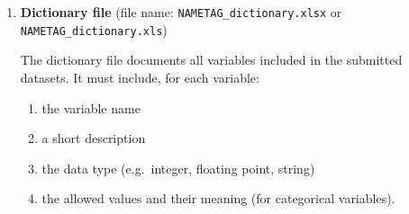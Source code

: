 \documentclass[11pt,a4paper]{article}
\begin{document}
\begin{enumerate}
\begin{table}[H]
\begin{tabularx}{\textwidth}{>{\raggedright\arraybackslash}p{2.5cm} >{\raggedright\arraybackslash}p{1.8cm} >{\raggedright\arraybackslash}p{2.3cm} X}
    \bottomrule
    \end{tabularx}
    \end{table}

    \noindent The columns \texttt{day}, \texttt{month}, \texttt{year} and \texttt{dayofweek} must be consistent with \texttt{sday\_id}. The column \texttt{holiday} is recommended but not obligatory; it may be omitted entirely. If it is provided, the dictionary file must state the calendars used (region, school year, source) and the dates counted as holiday. The column \texttt{wave} is recommended for panel and repeated studies; if it is provided, the dictionary file must state what a wave is (a fixed round of the same panel, a repeated multi-day measurement or a recruitment batch) and how \texttt{wave} relates to \texttt{panel\_id}.

    \item \textbf{Dictionary file} (file name: \texttt{NAMETAG\_dictionary.xlsx} or \texttt{NAMETAG\_dictionary.xls})

    The dictionary file documents all variables included in the submitted datasets. It must include, for each variable:
    \begin{enumerate}
        \item  the variable name
        \item a short description
        \item the data type (e.g.\ integer, floating point, string)
        \item the allowed values and their meaning (for categorical variables).
    \end{enumerate}
    

\end{enumerate}
\end{document}
